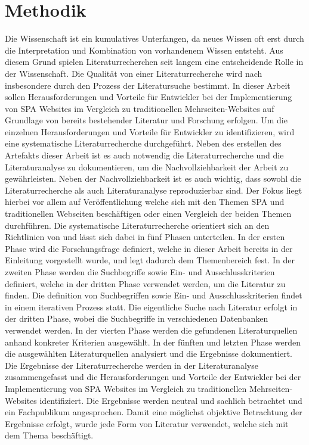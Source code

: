 \section{Methodik}
Die Wissenschaft ist ein kumulatives Unterfangen, da neues Wissen oft erst durch die Interpretation und Kombination von vorhandenem Wissen entsteht.
Aus diesem Grund spielen Literaturrecherchen seit langem eine entscheidende Rolle in der Wissenschaft.\cite{conf/ecis/BrockeSNRPC09}
Die Qualität von einer Literaturrecherche wird nach \citeauthor{conf/ecis/BrockeSNRPC09} insbesondere durch den Prozess der Literatursuche bestimmt.
In dieser Arbeit sollen Herausforderungen und Vorteile für Entwickler bei der Implementierung von \ac{SPA} Websites im Vergleich zu traditionellen Mehrseiten-Websites auf Grundlage von bereits bestehender Literatur und Forschung erfolgen.
Um die einzelnen Herausforderungen und Vorteile für Entwickler zu identifizieren, wird eine systematische Literaturrecherche durchgeführt.
Neben des erstellen des Artefakts dieser Arbeit ist es auch notwendig die Literaturrecherche und die Literaturanalyse zu dokumentieren, um die Nachvollziehbarkeit der Arbeit zu gewährleisten.
Neben der Nachvollziehbarkeit ist es auch wichtig, dass sowohl die Literaturrecherche als auch Literaturanalyse reproduzierbar sind.
Der Fokus liegt hierbei vor allem auf Veröffentlichung welche sich mit den Themen \ac{SPA} und traditionellen Webseiten beschäftigen oder einen Vergleich der beiden Themen durchführen.
Die systematische Literaturrecherche orientiert sich an den Richtlinien von \citeauthor{conf/ecis/BrockeSNRPC09} und lässt sich dabei in fünf Phasen unterteilen.
In der ersten Phase wird die Forschungsfrage definiert, welche in dieser Arbeit bereits in der Einleitung vorgestellt wurde, und legt dadurch dem Themenbereich fest.
In der zweiten Phase werden die Suchbegriffe sowie Ein- und Ausschlusskriterien definiert, welche in der dritten Phase verwendet werden, um die Literatur zu finden.
Die definition von Suchbegriffen sowie Ein- und Ausschlusskriterien findet in einem iterativen Prozess statt.
Die eigentliche Suche nach Literatur erfolgt in der dritten Phase, wobei die Suchbegriffe in verschiedenen Datenbanken verwendet werden.
In der vierten Phase werden die gefundenen Literaturquellen anhand konkreter Kriterien ausgewählt.
In der fünften und letzten Phase werden die ausgewählten Literaturquellen analysiert und die Ergebnisse dokumentiert. \cite{conf/ecis/BrockeSNRPC09}
Die Ergebnisse der Literaturrecherche werden in der Literaturanalyse zusammengefasst und die Herausforderungen und Vorteile der Entwickler bei der Implementierung von \ac{SPA} Websites im Vergleich zu traditionellen Mehrseiten-Websites identifiziert.
Die Ergebnisse werden neutral und sachlich betrachtet und ein Fachpublikum angesprochen. Damit eine möglichst objektive Betrachtung der Ergebnisse erfolgt, wurde jede Form von Literatur verwendet, welche sich mit dem Thema beschäftigt.

